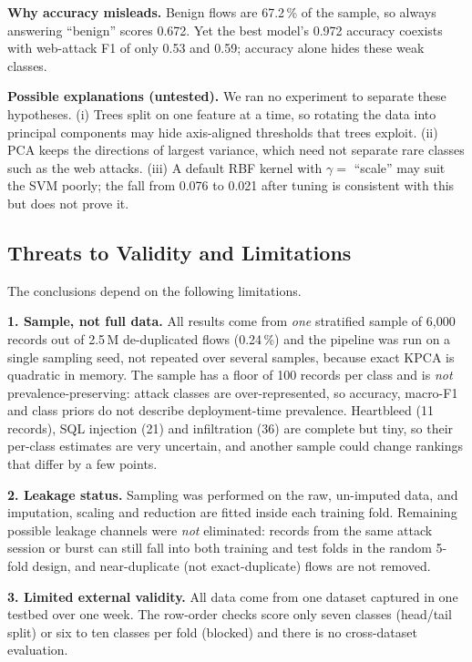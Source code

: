 \documentclass[runningheads]{llncs}
\begin{document}
\textbf{Why accuracy misleads.} Benign flows are 67.2\,\% of the sample, so always answering ``benign'' scores 0.672. Yet the best model's 0.972 accuracy coexists with web-attack F1 of only 0.53 and 0.59; accuracy alone hides these weak classes.

\textbf{Possible explanations (untested).} We ran no experiment to separate these hypotheses. (i) Trees split on one feature at a time, so rotating the data into principal components may hide axis-aligned thresholds that trees exploit. (ii) PCA keeps the directions of largest variance, which need not separate rare classes such as the web attacks. (iii) A default RBF kernel with $\gamma=$ ``scale'' may suit the SVM poorly; the fall from 0.076 to 0.021 after tuning is consistent with this but does not prove it.

\subsection{Threats to Validity and Limitations}
The conclusions depend on the following limitations.

\textbf{1. Sample, not full data.} All results come from \emph{one} stratified sample of 6{,}000 records out of 2.5\,M de-duplicated flows (0.24\,\%) and the pipeline was run on a single sampling seed, not repeated over several samples, because exact KPCA is quadratic in memory. The sample has a floor of 100 records per class and is \emph{not} prevalence-preserving: attack classes are over-represented, so accuracy, macro-F1 and class priors do not describe deployment-time prevalence. Heartbleed (11 records), SQL injection (21) and infiltration (36) are complete but tiny, so their per-class estimates are very uncertain, and another sample could change rankings that differ by a few points.

\textbf{2. Leakage status.} Sampling was performed on the raw, un-imputed data, and imputation, scaling and reduction are fitted inside each training fold. Remaining possible leakage channels were \emph{not} eliminated: records from the same attack session or burst can still fall into both training and test folds in the random 5-fold design, and near-duplicate (not exact-duplicate) flows are not removed.

\textbf{3. Limited external validity.} All data come from one dataset captured in one testbed over one week. The row-order checks score only seven classes (head/tail split) or six to ten classes per fold (blocked) and there is no cross-dataset evaluation.
\end{document}
